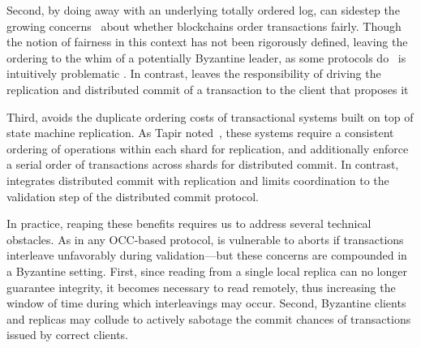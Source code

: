 
Second, by doing away with an underlying totally ordered log, \sys{} can
sidestep the growing concerns~\cite{} about whether blockchains
order transactions fairly. Though the notion of fairness in this
context has not been rigorously defined, leaving the ordering to the
whim of a potentially Byzantine leader, as some protocols do~\cite{
Kotla07Zyzzyva,castro1999practical}
is intuitively problematic \cite{herlihy2016enhancing}. In contrast, \sys leaves the
responsibility of driving the replication and distributed commit of a
transaction to the client that proposes it  

Third, \sys{} avoids the duplicate ordering costs of transactional systems
built on top of state machine replication. As Tapir noted~\cite{zhang2015tapir,mu2016consolidating},
these systems require a consistent ordering of
operations within each shard for replication, and additionally enforce a serial order of transactions across
shards for distributed commit. In contrast, \sys{} integrates distributed commit with 
replication and
limits coordination to the validation step of the distributed commit
protocol. %

In practice, reaping these benefits requires us to address several
technical obstacles. As in  any OCC-based protocol, \sys
is vulnerable to aborts if transactions interleave unfavorably during
validation---but these concerns are compounded in a Byzantine
setting. First, since reading from a single local replica can no
longer guarantee integrity, it becomes necessary to read remotely,
thus increasing the window of time during which 
interleavings may occur. Second, Byzantine clients and replicas may
collude to actively sabotage the commit chances of transactions issued
by correct clients. 

